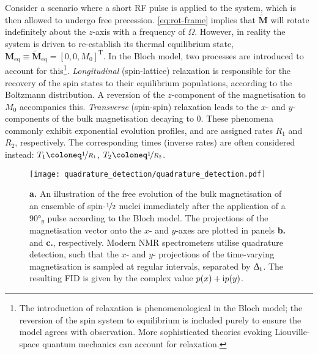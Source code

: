 Consider a scenario where a short \ac{RF} pulse is applied to the system, which
is then allowed to undergo free precession. \cref{eq:rot-frame} implies that
$\tilde{\symbf{M}}$ will rotate indefinitely about the $z$-axis with a
frequency of $\Omega$. However, in reality the system is driven to re-establish
its thermal equilibrium state, $\symbf{M}_{\text{eq}} \equiv
\tilde{\symbf{M}}_{\text{eq}} = [0, 0, M_0]^{\mathrm{T}}$. In the
Bloch model, two processes are introduced to account for this\footnote{
    The introduction of relaxation is phenomenological in the Bloch model; the
    reversion of the spin system to equilibrium is included purely to ensure
    the model agrees with observation. More sophisticated theories evoking
    Liouville-space quantum mechanics can account for
    relaxation\cite{Goldman2001,Kuprov2007}.
}. \emph{Longitudinal} (spin-lattice)
relaxation is responsible for the recovery of the spin states to their
equilibrium populations, according to the Boltzmann distribution. A reversion
of the $z$-component of the magnetisation to $M_0$ accompanies this.
\emph{Transverse} (spin-spin) relaxation leads to the $x$- and $y$-components
of the bulk magnetisation decaying to $0$. These phenomena commonly exhibit
exponential evolution profiles, and are assigned rates $R_1$ and $R_2$,
respectively. The corresponding times (inverse rates) are often considered
instead:
$T_1 \coloneq \nicefrac{1}{R_1}$,
$T_2 \coloneq \nicefrac{1}{R_2}$.
\begin{figure}
    \centering
    \texttt{[image: quadrature\_detection/quadrature\_detection.pdf]}
    \caption[
        An illustration of the free evolution of the bulk
        magnetisation of an ensemble of spin-$\nicefrac{1}{2}$ nuclei
        according to the Bloch model.
    ]{
        \textbf{a.} An illustration of the free evolution of the bulk
        magnetisation of an ensemble of spin-$\nicefrac{1}{2}$ nuclei
        immediately after the application of a $\ang{90}_y$ pulse according to
        the Bloch model.
        The projections of the magnetisation vector onto the
        $x$- and  $y$-axes are plotted in panels \textbf{b.} and \textbf{c.},
        respectively. Modern \acs{NMR} spectrometers utilise quadrature
        detection, such that the $x$- and  $y$- projections of the time-varying
        magnetisation is sampled at regular intervals, separated by $\Updelta_t$.
        The resulting \acs{FID} is given by the complex value $p(x) + \mathrm{i}
        p(y)$.
    }\label{fig:quadrature}
\end{figure}

